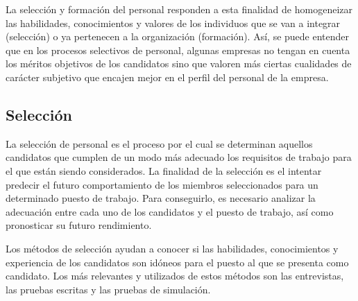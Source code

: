 \documentclass[
]{krantz}
\begin{document}
La selección y formación del personal responden a esta finalidad de homogeneizar las habilidades, conocimientos y valores de los individuos que se van a integrar (selección) o ya pertenecen a la organización (formación). Así, se puede entender que en los procesos selectivos de personal, algunas empresas no tengan en cuenta los méritos objetivos de los candidatos sino que valoren más ciertas cualidades de carácter subjetivo que encajen mejor en el perfil del personal de la empresa.

\hypertarget{selecciuxf3n}{%
\subsection{Selección}\label{selecciuxf3n}}

La selección de personal es el proceso por el cual se determinan aquellos candidatos que cumplen de un modo más adecuado los requisitos de trabajo para el que están siendo considerados. La finalidad de la selección es el intentar predecir el futuro comportamiento de los miembros seleccionados para un determinado puesto de trabajo. Para conseguirlo, es necesario analizar la adecuación entre cada uno de los candidatos y el puesto de trabajo, así como pronosticar su futuro rendimiento.

Los métodos de selección ayudan a conocer si las habilidades, conocimientos y experiencia de los candidatos son idóneos para el puesto al que se presenta como candidato. Los más relevantes y utilizados de estos métodos son las entrevistas, las pruebas escritas y las pruebas de simulación.
\end{document}
